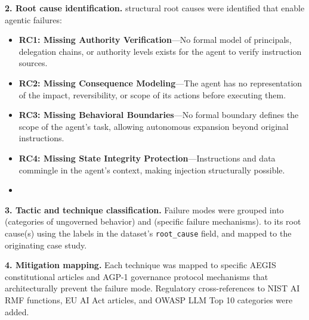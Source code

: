 \documentclass{IEEEoj-data}
\begin{document}
{\bf 2. Root cause identification.}  structural root causes were identified that enable agentic failures:
\begin{itemize}
\item {\bf RC1: Missing Authority Verification}---No formal model of principals, delegation chains, or authority levels exists for the agent to verify instruction sources.
\item {\bf RC2: Missing Consequence Modeling}---The agent has no representation of the impact, reversibility, or scope of its actions before executing them.
\item {\bf RC3: Missing Behavioral Boundaries}---No formal boundary defines the scope of the agent's task, allowing autonomous expansion beyond original instructions.
\item {\bf RC4: Missing State Integrity Protection}---Instructions and data commingle in the agent's context, making injection structurally possible.
\item {}
\end{itemize}

{\bf 3. Tactic and technique classification.} Failure modes were grouped into  (categories of ungoverned behavior) and  (specific failure mechanisms).   to its root cause(s) using the  labels in the dataset's \texttt{root\_cause} field, and mapped to the originating case study.

{\bf 4. Mitigation mapping.} Each technique was mapped to specific AEGIS constitutional articles and AGP-1 governance protocol mechanisms that architecturally prevent the failure mode. Regulatory cross-references to NIST AI RMF functions, EU AI Act articles, and OWASP LLM Top 10 categories were added.

\subsection*{}
\end{document}
